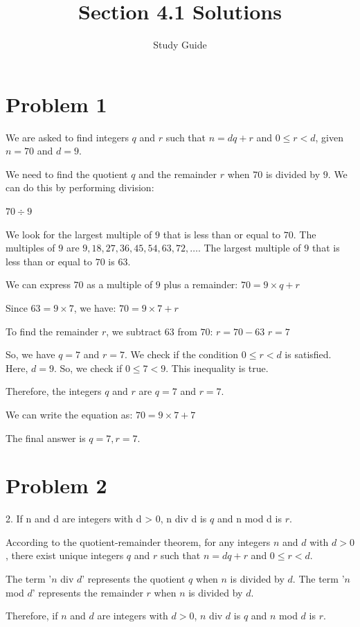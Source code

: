 \documentclass{article}
\begin{document}
\title{Section 4.1 Solutions}
\author{Study Guide}\n\maketitle
\section*{Problem 1}
We are asked to find integers $q$ and $r$ such that $n = dq + r$ and $0 \le r < d$, given $n = 70$ and $d = 9$.

We need to find the quotient $q$ and the remainder $r$ when $70$ is divided by $9$.
We can do this by performing division:

$70 \div 9$

We look for the largest multiple of $9$ that is less than or equal to $70$.
The multiples of $9$ are $9, 18, 27, 36, 45, 54, 63, 72, \ldots$.
The largest multiple of $9$ that is less than or equal to $70$ is $63$.

We can express $70$ as a multiple of $9$ plus a remainder:
$70 = 9 \times q + r$

Since $63 = 9 \times 7$, we have:
$70 = 9 \times 7 + r$

To find the remainder $r$, we subtract $63$ from $70$:
$r = 70 - 63$
$r = 7$

So, we have $q = 7$ and $r = 7$.
We check if the condition $0 \le r < d$ is satisfied.
Here, $d = 9$. So, we check if $0 \le 7 < 9$.
This inequality is true.

Therefore, the integers $q$ and $r$ are $q = 7$ and $r = 7$.

We can write the equation as:
$70 = 9 \times 7 + 7$

The final answer is $\boxed{q=7, r=7}$.

\newpage

\section*{Problem 2}
2. If n and d are integers with d > 0, n div d is $q$ and n mod d is $r$.

According to the quotient-remainder theorem, for any integers $n$ and $d$ with $d > 0$, there exist unique integers $q$ and $r$ such that $n = dq + r$ and $0 \le r < d$.

The term '$n$ div $d$' represents the quotient $q$ when $n$ is divided by $d$.
The term '$n$ mod $d$' represents the remainder $r$ when $n$ is divided by $d$.

Therefore, if $n$ and $d$ are integers with $d > 0$, $n$ div $d$ is $q$ and $n$ mod $d$ is $r$.
\end{document}
